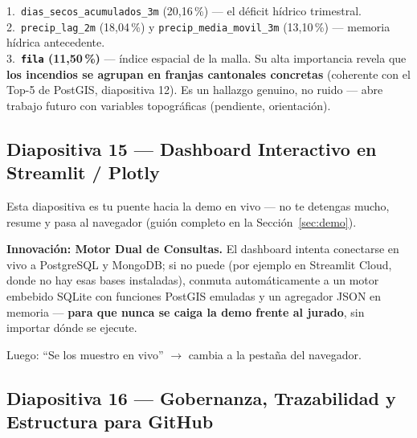 \documentclass[11pt,a4paper]{article}
\begin{document}
\begin{datobox}[title={Variables m\'as importantes --- y por qu\'e la \#4 es interesante}]
1.\ \texttt{dias\_secos\_acumulados\_3m} (20,16\,\%) --- el d\'eficit h\'idrico trimestral.\\
2.\ \texttt{precip\_lag\_2m} (18,04\,\%) y \texttt{precip\_media\_movil\_3m} (13,10\,\%) --- memoria h\'idrica antecedente.\\
3.\ \textbf{\texttt{fila} (11,50\,\%)} --- \'indice espacial de la malla. Su alta importancia revela que \textbf{los incendios se agrupan en franjas cantonales concretas} (coherente con el Top-5 de PostGIS, diapositiva 12). Es un hallazgo genuino, no ruido --- abre trabajo futuro con variables topogr\'aficas (pendiente, orientaci\'on).
\end{datobox}

\subsection{Diapositiva 15 --- Dashboard Interactivo en Streamlit / Plotly}

Esta diapositiva es tu puente hacia la demo en vivo --- no te detengas mucho, resume y pasa al navegador (gui\'on completo en la Secci\'on~\ref{sec:demo}).

\begin{decirbox}[title={Menciona solo la pieza m\'as ``de ingenier\'ia''}]
\textbf{Innovaci\'on: Motor Dual de Consultas.} El dashboard intenta conectarse en vivo a PostgreSQL y MongoDB; si no puede (por ejemplo en Streamlit Cloud, donde no hay esas bases instaladas), conmuta autom\'aticamente a un motor embebido SQLite con funciones PostGIS emuladas y un agregador JSON en memoria --- \textbf{para que nunca se caiga la demo frente al jurado}, sin importar d\'onde se ejecute.

Luego: ``Se los muestro en vivo'' $\to$ cambia a la pesta\~na del navegador.
\end{decirbox}

\subsection{Diapositiva 16 --- Gobernanza, Trazabilidad y Estructura para GitHub}
\end{document}
